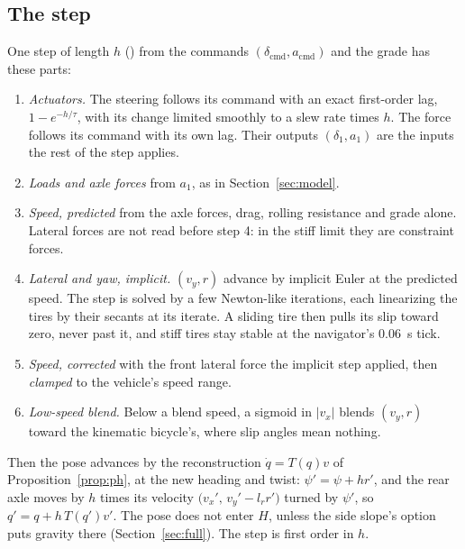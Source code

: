 \documentclass[11pt]{article}
\theoremstyle{remark}
\begin{document}
\subsection{The step}
One step of length $h$ () from the commands $(\delta_{\mathrm{cmd}},a_{\mathrm{cmd}})$
and the grade has these parts:
\begin{enumerate}
  \item \emph{Actuators.} The steering follows its command with an exact first-order lag,
        $1-e^{-h/\tau}$, with its change limited smoothly to a slew rate times $h$. The force
        follows its command with its own lag. Their outputs $(\delta_1,a_1)$ are the inputs the rest
        of the step applies.
  \item \emph{Loads and axle forces} from $a_1$, as in Section~\ref{sec:model}.
  \item \emph{Speed, predicted} from the axle forces, drag, rolling resistance and grade alone.
        Lateral forces are not read before step 4: in the stiff limit they are constraint forces.
  \item \emph{Lateral and yaw, implicit.} $(v_y,r)$ advance by implicit Euler at the predicted
        speed. The step is solved by a few Newton-like iterations, each linearizing the tires by
        their secants at its iterate. A sliding tire then pulls its slip toward zero, never past
        it, and stiff tires stay stable at the navigator's 0.06~s tick.
  \item \emph{Speed, corrected} with the front lateral force the implicit step applied, then
        \emph{clamped} to the vehicle's speed range.
  \item \emph{Low-speed blend.} Below a blend speed, a sigmoid in $\lvert v_x\rvert$ blends $(v_y,r)$
        toward the kinematic bicycle's, where slip angles mean nothing.
\end{enumerate}
Then the pose advances by the reconstruction $\dot q=T(q)v$ of Proposition~\ref{prop:ph}, at the new
heading and twist: $\psi'=\psi+hr'$, and the rear axle moves by $h$ times its velocity
$\big(v_x',\,v_y'-l_rr'\big)$ turned by $\psi'$, so $q'=q+h\,T(q')v'$. The pose does not enter
$H$, unless the side slope's option puts gravity there (Section~\ref{sec:full}). The step is first
order in $h$.
\end{document}
